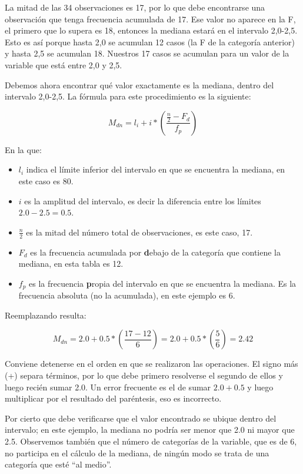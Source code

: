 \documentclass[]{book}
\begin{document}
La mitad de las 34 observaciones es 17, por lo que debe encontrarse una
observación que tenga frecuencia acumulada de 17. Ese valor no aparece
en la F, el primero que lo supera es 18, entonces la mediana estará en
el intervalo 2,0-2,5. Esto es así porque hasta 2,0 se acumulan 12 casos
(la F de la categoría anterior) y hasta 2,5 se acumulan 18. Nuestros 17
casos se acumulan para un valor de la variable que está entre 2,0 y 2,5.

Debemos ahora encontrar qué valor exactamente es la mediana, dentro del
intervalo 2,0-2,5. La fórmula para este procedimiento es la siguiente:

\[M_{dn} = l_{i} + i*\left( \frac{\frac{n}{2} - F_d}{f_{p}} \right)\]

En la que:

\begin{itemize}
\item
  \(l_i\) indica el límite inferior del intervalo en que se encuentra la mediana, en este caso es 80.
\item
  \(i\) es la amplitud del intervalo, es decir la diferencia entre los límites \(2.0-2.5 = 0.5\).
\item
  \(\frac{n}{2}\) es la mitad del número total de observaciones, es este caso, 17.
\item
  \(F_d\) es la frecuencia acumulada por \textbf{d}ebajo de la categoría que contiene la mediana, en esta tabla es 12.
\item
  \(f_p\) es la frecuencia \textbf{p}ropia del intervalo en que se encuentra la mediana. Es la frecuencia absoluta (no la acumulada), en este ejemplo es 6.
\end{itemize}

Reemplazando resulta:

\[M_{dn} = 2.0 + 0.5*\left( \frac{17 - 12}{6} \right) = 2.0 + 0.5*\left( \frac{5}{6} \right) = 2.42\]

Conviene detenerse en el orden en que se realizaron las operaciones. El
signo más (+) separa términos, por lo que debe primero resolverse el
segundo de ellos y luego recién sumar 2.0. Un error frecuente es el de
sumar \(2.0 + 0.5\) y luego multiplicar por el resultado del paréntesis, eso
es incorrecto.

Por cierto que debe verificarse que el valor encontrado se ubique dentro
del intervalo; en este ejemplo, la mediana no podría ser menor que 2.0
ni mayor que 2.5. Observemos también que el número de categorías de la
variable, que es de 6, no participa en el cálculo de la mediana, de
ningún modo se trata de una categoría que esté ``al medio''.
\end{document}
